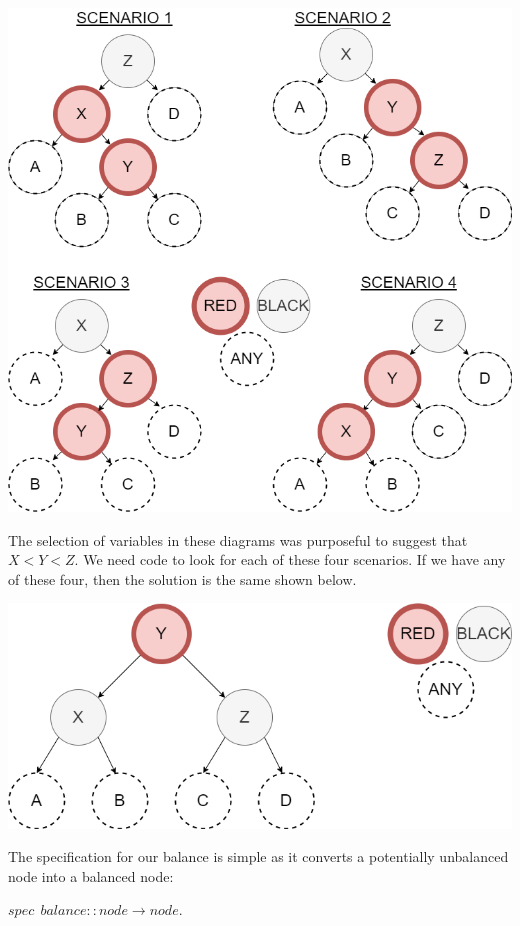 \documentclass[
]{book}
\begin{document}
\includegraphics{images/rbt_balance.drawio.png}

The selection of variables in these diagrams was purposeful to suggest that \(X < Y < Z\). We need code to look for each of these four scenarios. If we have any of these four, then the solution is the same shown below.

\includegraphics{images/rbt_balance_result.drawio.png}

The specification for our balance is simple as it converts a potentially unbalanced node into a balanced node:

\begin{formulabox}
\(spec ~ ~ balance :: node \rightarrow node.\)

\end{formulabox}
\end{document}

